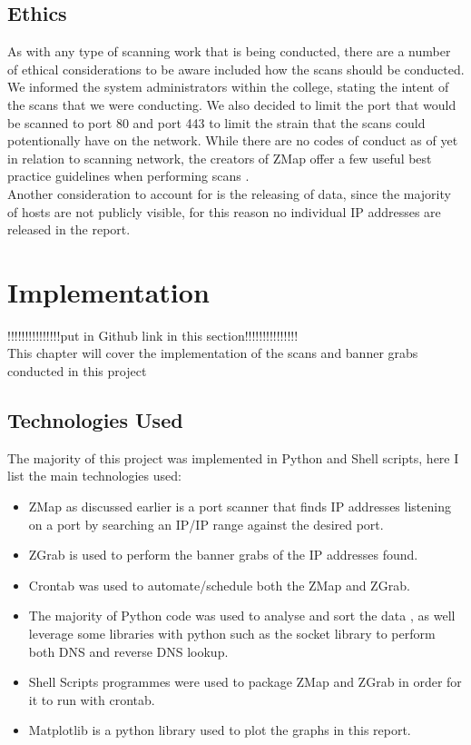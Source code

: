 \documentclass[a4wide,leqno,12pt]{report}
\begin{document}
\section{Ethics}


As with any type of scanning work that is being conducted, there are a number of ethical considerations to be aware included how the scans should be conducted. We informed the system administrators within the college, stating the intent of the scans that we were conducting. We also decided to limit the port that would be scanned to port 80 and port 443 to limit the strain that the scans could potentionally have on the network. While there are no codes of conduct as of yet in relation to scanning network, the creators of ZMap offer a few useful best practice guidelines when performing scans\cite{durumeric2015search}  \cite{durumeric2013zmap}.\\

Another consideration to account for is the releasing of data, since the majority of hosts are not publicly visible, for this reason no individual IP addresses are released in the report.
\chapter{Implementation}

!!!!!!!!!!!!!!!put in Github link in this section!!!!!!!!!!!!!!!\\

This chapter will cover the implementation of the scans and banner grabs conducted in this project
\section{Technologies Used}
The majority of this project was implemented in Python and Shell scripts, here I list the main technologies used:
\begin{itemize}
  \item ZMap as discussed earlier is a port scanner that finds IP addresses listening on a port by searching an IP/IP range against the desired port.
  \item ZGrab is used to perform the banner grabs of the IP addresses found.
  \item Crontab was used to automate/schedule both the ZMap and ZGrab.
  \item The majority of Python code was used to analyse and sort the data , as well leverage some libraries with python such as the socket library \cite{socket} to perform both DNS and reverse DNS lookup.
  \item Shell Scripts programmes were used to package ZMap and ZGrab in order for it to run with crontab.
  \item Matplotlib \cite{matplotlib} is a python library used to plot the graphs in this report.
\end{itemize}
\end{document}
